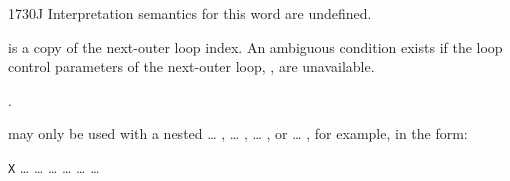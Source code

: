 \vspace*{-2ex}
\begin{worddef}{1730}{J}
\interpret
	Interpretation semantics for this word are undefined.

\execute

	 is a copy of the next-outer loop index. An
	ambiguous condition exists if the loop control parameters of
	the next-outer loop, , are unavailable.

\see {}.

	\begin{rationale} %
		 may only be used with a nested
		 {\ldots} ,
		 {\ldots} ,
		 {\ldots} , or
		 {\ldots} ,
		for example, in the form:

		\tab \word{:} \texttt{X}
			{\ldots} 
				{\ldots} 
					{\ldots}  {\ldots}
			{\ldots} 
		{\ldots} \word{;}
	\end{rationale}

	\begin{testing} %
		 \\
		 \\
		 \\

		 \\
		 \\
		 \\
	\end{testing}
\end{worddef}

